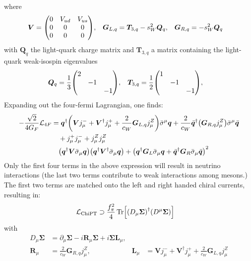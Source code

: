 where
\begin{align}
    \bm{V}
            & =
    \mqty(0 & V_{ud} & V_{us} \\ 0&0&0\\ 0&0&0),
            &
    \bm{G}_{L,q}
            & =
    \bm{T}_{3,q} - s_{W}^{2}\bm{Q}_{q},
            &
    \bm{G}_{R,q}
            & =
    -s_{W}^{2}\bm{Q}_{q}
\end{align}
with \(\bm{Q}_{q}\) the light-quark charge matrix and \(\bm{T}_{3,q}\) a matrix
containing the light-quark weak-isospin eigenvalues
\begin{align}
    \bm{Q}_{q}
     & =
    \frac{1}{3}\mqty(\dmat{2,-1,-1}),
     &
    \bm{T}_{3,q}
     & =
    \frac{1}{2}\mqty(\dmat{1,-1,-1}),
\end{align}
Expanding out the four-fermi Lagrangian, one finds:
\begin{align}
    -\frac{\sqrt{2}}{4G_{F}}\mathcal{L}_{4F}
     & =
    \bm{q}^{\dagger}\qty(
    \bm{V}j^{-}_{\mu}
    + \bm{V}^{\dagger}j^{+}_{\mu}
    + \frac{2}{c_{W}}\bm{G}_{L,q}j^{Z}_{\mu}
    )\bar{\sigma}^{\mu}\bm{q}
    +\frac{2}{c_{W}}
    \bar{\bm{q}}^{\dagger}\qty(
    \bm{G}_{R,q}j^{Z}_{\mu}
    )\bar{\sigma}^{\mu}\bar{\bm{q}} \\
     & \quad
    + j^{+}_{\mu}j^{-}_{\mu}
    + j^{Z}_{\mu}j^{Z}_{\mu}\notag  \\
     & \quad
    \qty(\bm{q}^{\dagger}\bm{V}\bar{\sigma}_{\mu}\bm{q})
    \qty(\bm{q}^{\dagger}\bm{V}^{\dagger}\bar{\sigma}_{\mu}\bm{q})
    + \qty(\bm{q}^{\dagger}\bm{G}_{L}\bar{\sigma}_{\mu}\bm{q} +
    \bar{\bm{q}}^{\dagger}\bm{G}_{R}\bar{\sigma}_{\mu}\bar{\bm{q}})^{2}
    \notag
\end{align}
Only the first four terms in the above expression will result in neutrino
interactions (the last two terms contribute to weak interactions among mesons.)
The first two terms are matched onto the left and right handed chiral currents,
resulting in:
\begin{align}
    \mathcal{L}_{\mathrm{ChiPT}} & \supset \frac{f_{\pi}^{2}}{4}\Tr[
        \qty(D_{\mu}\bm{\Sigma})^{\dagger}
        \qty(D^{\mu}\bm{\Sigma})
    ]
\end{align}
with
\begin{align}
    D_{\mu}\bm{\Sigma}
     & =
    \partial_{\mu}\bm{\Sigma}
    - i\bm{R}_{\mu}\bm{\Sigma}
    + i\bm{\Sigma}\bm{L}_{\mu}, \\
    \bm{R}_{\mu}
     & =
    \frac{2}{c_{W}}
    \bm{G}_{R,q}j^{Z}_{\mu},
     &
    \bm{L}_{\mu}
     & =
    \bm{V}j^{-}_{\mu}
    + \bm{V}^{\dagger}j^{+}_{\mu}
    + \frac{2}{c_{W}}\bm{G}_{L,q}j^{Z}_{\mu}
\end{align}
